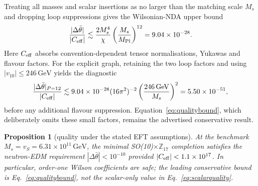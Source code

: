 \documentclass[11pt,a4paper]{article}
\newtheorem{proposition}{Proposition}
\newcommand{\GeV}{\,\mathrm{GeV}}
\newcommand{\Zs}{\mathbb{Z}_{17}}
\begin{document}
Treating all masses and scalar insertions as no larger than the matching
scale $M_s$ and dropping loop suppressions gives the Wilsonian-NDA upper bound
\begin{equation}
 \frac{|\Delta\bar\theta|}{|C_{\rm eff}|}
 \lesssim \frac{2M_s^4}{\chi}
 \left(\frac{M_s}{M_{\rm Pl}}\right)^{12}
 =9.04\times10^{-28} .
\label{eq:qualitybound}
\end{equation}
Here $C_{\rm eff}$ absorbs convention-dependent tensor normalisations,
Yukawas and flavour factors. For the explicit graph, retaining the two
loop factors and using $|v_{10}|\leq246\GeV$ yields the diagnostic
\begin{equation}
 \frac{|\Delta\bar\theta|_{P=12}}{|C_{\rm eff}|}
 \lesssim 9.04\times10^{-28}(16\pi^2)^{-2}
 \left(\frac{246\GeV}{M_s}\right)^2
 =5.50\times10^{-51},
\label{eq:refinedgraph}
\end{equation}
before any additional flavour suppression. Equation~\eqref{eq:qualitybound},
which deliberately omits these small factors, remains the advertised
conservative result.

\begin{proposition}[quality under the stated EFT assumptions]
At the benchmark $M_s=v_S=6.31\times10^{11}\GeV$, the minimal
SO(10)$\times\Zs$ completion satisfies the neutron-EDM requirement
$|\Delta\bar\theta|<10^{-10}$ provided
$|C_{\rm eff}|<1.1\times10^{17}$. In particular, order-one Wilson
coefficients are safe; the leading conservative bound is
Eq.~\eqref{eq:qualitybound}, not the scalar-only value in
Eq.~\eqref{eq:scalarquality}.
\end{proposition}
\end{document}
